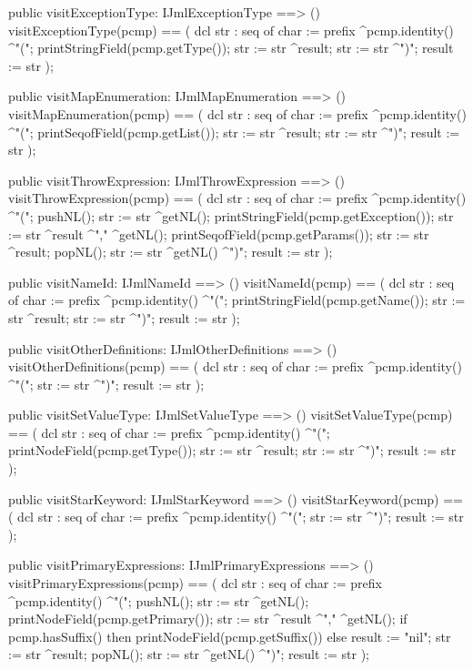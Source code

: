 \begin{vdm_al}
  public visitExceptionType: IJmlExceptionType ==> ()
  visitExceptionType(pcmp) ==
    ( dcl str : seq of char := prefix ^pcmp.identity() ^"(";
      printStringField(pcmp.getType());
      str := str ^result;
      str := str ^")";
      result := str );

  public visitMapEnumeration: IJmlMapEnumeration ==> ()
  visitMapEnumeration(pcmp) ==
    ( dcl str : seq of char := prefix ^pcmp.identity() ^"(";
      printSeqofField(pcmp.getList());
      str := str ^result;
      str := str ^")";
      result := str );

  public visitThrowExpression: IJmlThrowExpression ==> ()
  visitThrowExpression(pcmp) ==
    ( dcl str : seq of char := prefix ^pcmp.identity() ^"(";
      pushNL();
      str := str ^getNL();
      printStringField(pcmp.getException());
      str := str ^result ^"," ^getNL();
      printSeqofField(pcmp.getParams());
      str := str ^result;
      popNL();
      str := str ^getNL() ^")";
      result := str );

  public visitNameId: IJmlNameId ==> ()
  visitNameId(pcmp) ==
    ( dcl str : seq of char := prefix ^pcmp.identity() ^"(";
      printStringField(pcmp.getName());
      str := str ^result;
      str := str ^")";
      result := str );

  public visitOtherDefinitions: IJmlOtherDefinitions ==> ()
  visitOtherDefinitions(pcmp) ==
    ( dcl str : seq of char := prefix ^pcmp.identity() ^"(";
      str := str ^")";
      result := str );

  public visitSetValueType: IJmlSetValueType ==> ()
  visitSetValueType(pcmp) ==
    ( dcl str : seq of char := prefix ^pcmp.identity() ^"(";
      printNodeField(pcmp.getType());
      str := str ^result;
      str := str ^")";
      result := str );

  public visitStarKeyword: IJmlStarKeyword ==> ()
  visitStarKeyword(pcmp) ==
    ( dcl str : seq of char := prefix ^pcmp.identity() ^"(";
      str := str ^")";
      result := str );

  public visitPrimaryExpressions: IJmlPrimaryExpressions ==> ()
  visitPrimaryExpressions(pcmp) ==
    ( dcl str : seq of char := prefix ^pcmp.identity() ^"(";
      pushNL();
      str := str ^getNL();
      printNodeField(pcmp.getPrimary());
      str := str ^result ^"," ^getNL();
      if pcmp.hasSuffix()
      then printNodeField(pcmp.getSuffix())
      else result := "nil";
      str := str ^result;
      popNL();
      str := str ^getNL() ^")";
      result := str );


\end{vdm_al}
